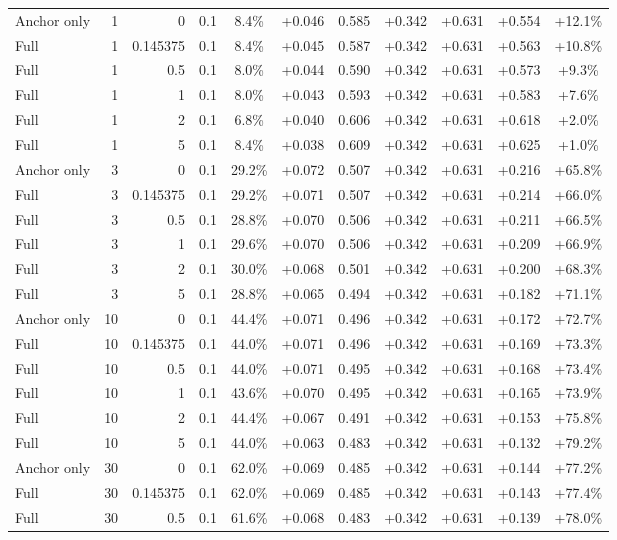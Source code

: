 \begin{table}[htbp]
\begin{tabular}{lrrrccccccc}
Anchor only & 1 & 0 & 0.1 & 8.4\% & +0.046 & 0.585 & +0.342 & +0.631 & +0.554 & +12.1\% \\
Full & 1 & 0.145375 & 0.1 & 8.4\% & +0.045 & 0.587 & +0.342 & +0.631 & +0.563 & +10.8\% \\
Full & 1 & 0.5 & 0.1 & 8.0\% & +0.044 & 0.590 & +0.342 & +0.631 & +0.573 & +9.3\% \\
Full & 1 & 1 & 0.1 & 8.0\% & +0.043 & 0.593 & +0.342 & +0.631 & +0.583 & +7.6\% \\
Full & 1 & 2 & 0.1 & 6.8\% & +0.040 & 0.606 & +0.342 & +0.631 & +0.618 & +2.0\% \\
Full & 1 & 5 & 0.1 & 8.4\% & +0.038 & 0.609 & +0.342 & +0.631 & +0.625 & +1.0\% \\
Anchor only & 3 & 0 & 0.1 & 29.2\% & +0.072 & 0.507 & +0.342 & +0.631 & +0.216 & +65.8\% \\
Full & 3 & 0.145375 & 0.1 & 29.2\% & +0.071 & 0.507 & +0.342 & +0.631 & +0.214 & +66.0\% \\
Full & 3 & 0.5 & 0.1 & 28.8\% & +0.070 & 0.506 & +0.342 & +0.631 & +0.211 & +66.5\% \\
Full & 3 & 1 & 0.1 & 29.6\% & +0.070 & 0.506 & +0.342 & +0.631 & +0.209 & +66.9\% \\
Full & 3 & 2 & 0.1 & 30.0\% & +0.068 & 0.501 & +0.342 & +0.631 & +0.200 & +68.3\% \\
Full & 3 & 5 & 0.1 & 28.8\% & +0.065 & 0.494 & +0.342 & +0.631 & +0.182 & +71.1\% \\
Anchor only & 10 & 0 & 0.1 & 44.4\% & +0.071 & 0.496 & +0.342 & +0.631 & +0.172 & +72.7\% \\
Full & 10 & 0.145375 & 0.1 & 44.0\% & +0.071 & 0.496 & +0.342 & +0.631 & +0.169 & +73.3\% \\
Full & 10 & 0.5 & 0.1 & 44.0\% & +0.071 & 0.495 & +0.342 & +0.631 & +0.168 & +73.4\% \\
Full & 10 & 1 & 0.1 & 43.6\% & +0.070 & 0.495 & +0.342 & +0.631 & +0.165 & +73.9\% \\
Full & 10 & 2 & 0.1 & 44.4\% & +0.067 & 0.491 & +0.342 & +0.631 & +0.153 & +75.8\% \\
Full & 10 & 5 & 0.1 & 44.0\% & +0.063 & 0.483 & +0.342 & +0.631 & +0.132 & +79.2\% \\
Anchor only & 30 & 0 & 0.1 & 62.0\% & +0.069 & 0.485 & +0.342 & +0.631 & +0.144 & +77.2\% \\
Full & 30 & 0.145375 & 0.1 & 62.0\% & +0.069 & 0.485 & +0.342 & +0.631 & +0.143 & +77.4\% \\
Full & 30 & 0.5 & 0.1 & 61.6\% & +0.068 & 0.483 & +0.342 & +0.631 & +0.139 & +78.0\% \\

\end{tabular}
\end{table}
